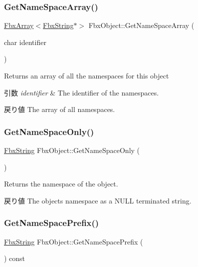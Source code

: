 \subsubsection{\texorpdfstring{Get\+Name\+Space\+Array()}{GetNameSpaceArray()}}
{\footnotesize\ttfamily \hyperlink{class_fbx_array}{Fbx\+Array}$<$\hyperlink{class_fbx_string}{Fbx\+String}$\ast$$>$ Fbx\+Object\+::\+Get\+Name\+Space\+Array (\begin{DoxyParamCaption}\item[{char}]{identifier }\end{DoxyParamCaption})}

Returns an array of all the namespaces for this object 
\begin{DoxyParams}{引数}
{\em identifier} & The identifier of the namespaces. \\
\hline
\end{DoxyParams}
\begin{DoxyReturn}{戻り値}
The array of all namespaces. 
\end{DoxyReturn}
\mbox{\label{class_fbx_object_a9cc9873c1d66722b964c04da5ec2001f}} 
\subsubsection{\texorpdfstring{Get\+Name\+Space\+Only()}{GetNameSpaceOnly()}}
{\footnotesize\ttfamily \hyperlink{class_fbx_string}{Fbx\+String} Fbx\+Object\+::\+Get\+Name\+Space\+Only (\begin{DoxyParamCaption}{ }\end{DoxyParamCaption})}

Returns the namespace of the object. \begin{DoxyReturn}{戻り値}
The object\textquotesingle{}s namespace as a {\ttfamily N\+U\+LL} terminated string. 
\end{DoxyReturn}
\mbox{\label{class_fbx_object_a8a0b08d810c3451ea912840caab53694}} 
\subsubsection{\texorpdfstring{Get\+Name\+Space\+Prefix()}{GetNameSpacePrefix()}}
{\footnotesize\ttfamily \hyperlink{class_fbx_string}{Fbx\+String} Fbx\+Object\+::\+Get\+Name\+Space\+Prefix (\begin{DoxyParamCaption}{ }\end{DoxyParamCaption}) const}

